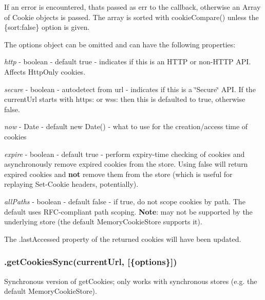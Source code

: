 If an error is encountered, that\textquotesingle{}s passed as {\ttfamily err} to the callback, otherwise an {\ttfamily Array} of {\ttfamily Cookie} objects is passed. The array is sorted with {\ttfamily cookie\+Compare()} unless the {\ttfamily \{sort\+:false\}} option is given.

The {\ttfamily options} object can be omitted and can have the following properties\+:


\begin{DoxyItemize}
\item {\itshape http} -\/ boolean -\/ default {\ttfamily true} -\/ indicates if this is an H\+T\+T\+P or non-\/\+H\+T\+T\+P A\+P\+I. Affects Http\+Only cookies.
\item {\itshape secure} -\/ boolean -\/ autodetect from url -\/ indicates if this is a \char`\"{}\+Secure\char`\"{} A\+P\+I. If the current\+Url starts with {\ttfamily https\+:} or {\ttfamily wss\+:} then this is defaulted to {\ttfamily true}, otherwise {\ttfamily false}.
\item {\itshape now} -\/ Date -\/ default {\ttfamily new Date()} -\/ what to use for the creation/access time of cookies
\item {\itshape expire} -\/ boolean -\/ default {\ttfamily true} -\/ perform expiry-\/time checking of cookies and asynchronously remove expired cookies from the store. Using {\ttfamily false} will return expired cookies and {\bfseries not} remove them from the store (which is useful for replaying Set-\/\+Cookie headers, potentially).
\item {\itshape all\+Paths} -\/ boolean -\/ default {\ttfamily false} -\/ if {\ttfamily true}, do not scope cookies by path. The default uses R\+F\+C-\/compliant path scoping. {\bfseries Note}\+: may not be supported by the underlying store (the default {\ttfamily Memory\+Cookie\+Store} supports it).
\end{DoxyItemize}

The {\ttfamily .last\+Accessed} property of the returned cookies will have been updated.

\subsubsection*{{\ttfamily .get\+Cookies\+Sync(current\+Url, \mbox{[}\{options\}\mbox{]})}}

Synchronous version of {\ttfamily get\+Cookies}; only works with synchronous stores (e.\+g. the default {\ttfamily Memory\+Cookie\+Store}).

